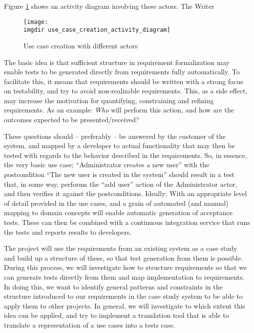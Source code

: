 Figure \ref{fig:use_case_creation_activity_diagram} shows an activity diagram involving these actors. The Writer 
\begin{figure}[!htbp]
\texttt{[image: \\imgdir use\_case\_creation\_activity\_diagram]}
\centering
\caption{Use case creation with different actors}
\label{fig:use_case_creation_activity_diagram}
\end{figure}
\noindent The basic idea is that sufficient structure in requirement formalization may enable tests to be generated directly from requirements fully automatically. To facilitate this, it means that requirements should be written with a strong focus on testability, and try to avoid non-realizable requirements. This, as a side effect, may increase the motivation for quantifying, constraining and refining requirements. As an example: \emph{Who} will perform this action, and how are the outcomes expected to be presented/received?\medskip

\noindent These questions should -- preferably -- be answered by the customer of the system, and mapped by a developer to actual functionality that may then be tested with regards to the behavior described in the requirements. So, in essence, the very basic use case; ``Administrator creates a new user'' with the postcondition ``The new user is created in the system'' should result in a test that, in some way, performs the ``add user'' action of the Administrator actor, and then verifies it against the postconditions. Ideally: With an appropriate level of detail provided in the use cases, and a grain of automated (and manual) mapping to domain concepts will enable automatic generation of acceptance tests. These can then be combined with a continuous integration service that runs the tests and reports results to developers.\medskip

\noindent The project will use the requirements from an existing system as a case study and build up a structure of these, so that test generation from them is possible. During this process, we will investigate how to structure requirements so that we can generate tests directly from them and map implementation to requirements. In doing this, we want to identify general patterns and constraints in the structure introduced to our requirements in the case study system to be able to apply them to other projects. In general, we will investigate to which extent this idea can be applied, and try to implement a translation tool that is able to translate a representation of a use cases into a tests case.\medskip

